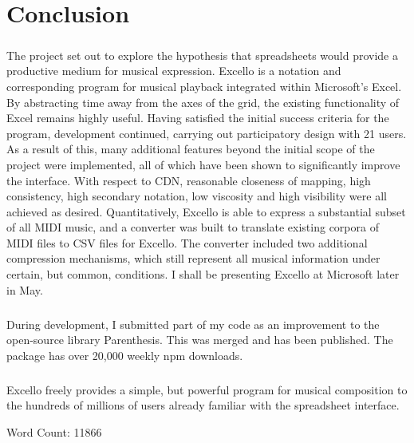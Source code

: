 
\chapter{Conclusion}

\paragraph{} The project set out to explore the hypothesis that spreadsheets would provide a productive medium for musical expression. Excello is a notation and corresponding program for musical playback integrated within Microsoft's Excel. By abstracting time away from the axes of the grid, the existing functionality of Excel remains highly useful. Having satisfied the initial success criteria for the program, development continued, carrying out participatory design with 21 users. As a result of this, many additional features beyond the initial scope of the project were implemented, all of which have been shown to significantly improve the interface. With respect to CDN, reasonable closeness of mapping, high consistency, high secondary notation, low viscosity and high visibility were all achieved as desired. Quantitatively, Excello is able to express a substantial subset of all  MIDI music, and a converter was built to translate existing corpora of MIDI files to CSV files for Excello. The converter included two additional compression mechanisms, which still represent all musical information under certain, but common, conditions. I shall be presenting Excello at Microsoft later in May.

\paragraph{} During development, I submitted part of my code as an improvement to the open-source library Parenthesis. This was merged and has been published. The package has over 20,000 weekly npm downloads.

\paragraph{} Excello freely provides a simple, but powerful program for musical composition to the hundreds of millions of users already familiar with the spreadsheet interface. \\

\begin{flushright}
Word Count: 11866
\end{flushright}

